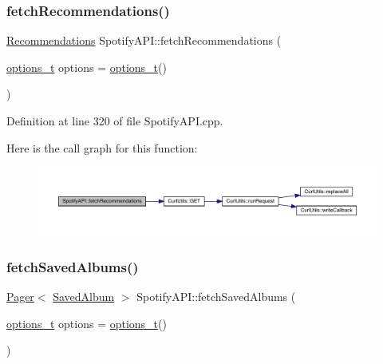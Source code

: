 \subsubsection{\texorpdfstring{fetch\+Recommendations()}{fetchRecommendations()}}
{\footnotesize\ttfamily \mbox{\hyperlink{class_recommendations}{Recommendations}} Spotify\+A\+P\+I\+::fetch\+Recommendations (\begin{DoxyParamCaption}\item[{\mbox{\hyperlink{_spotify_a_p_i_8h_a0ff5cac1a4007bb330b7d9939650c283}{options\+\_\+t}}}]{options = {\ttfamily \mbox{\hyperlink{_spotify_a_p_i_8h_a0ff5cac1a4007bb330b7d9939650c283}{options\+\_\+t}}()} }\end{DoxyParamCaption})}



Definition at line 320 of file Spotify\+A\+P\+I.\+cpp.

Here is the call graph for this function\+:
\nopagebreak
\begin{figure}[H]
\begin{center}
\leavevmode
\includegraphics[width=350pt]{class_spotify_a_p_i_a22c839c61fa06ac212d1c38a0ca5cd2f_cgraph}
\end{center}
\end{figure}
\mbox{\label{class_spotify_a_p_i_a3a1c8e4ea736afdb697560b0bd9783ef}} 
\subsubsection{\texorpdfstring{fetch\+Saved\+Albums()}{fetchSavedAlbums()}}
{\footnotesize\ttfamily \mbox{\hyperlink{class_pager}{Pager}}$<$ \mbox{\hyperlink{class_saved_album}{Saved\+Album}} $>$ Spotify\+A\+P\+I\+::fetch\+Saved\+Albums (\begin{DoxyParamCaption}\item[{\mbox{\hyperlink{_spotify_a_p_i_8h_a0ff5cac1a4007bb330b7d9939650c283}{options\+\_\+t}}}]{options = {\ttfamily \mbox{\hyperlink{_spotify_a_p_i_8h_a0ff5cac1a4007bb330b7d9939650c283}{options\+\_\+t}}()} }\end{DoxyParamCaption})}



